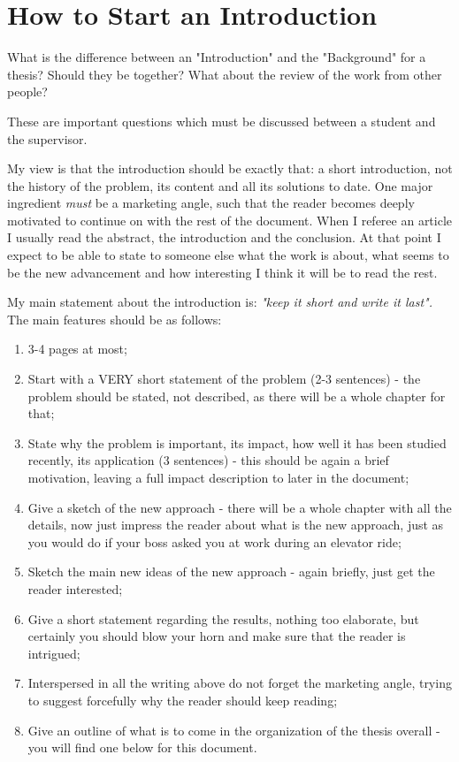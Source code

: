 \section{How to Start an Introduction}



What is the difference between an "Introduction" and the "Background" for a thesis? Should they be together? What about the review of the work from other people?

These are important questions which must be discussed between a student and the supervisor.

My view is that the introduction should be exactly that: a short introduction, not the history of the problem, its content and all its solutions to date. One major ingredient \textit{must} be a marketing angle, such that the reader becomes deeply motivated to continue on with the rest of the document. When I referee an article I usually read the abstract, the introduction and the conclusion. At that point I expect to be able to state to someone else what the work is about, what seems to be the new advancement and how interesting I think it will be to read the rest.

My main statement about the introduction is:
\textit{"keep it short and write it last".} The main features should be as follows:
\begin{enumerate}
\item {3-4 pages at most;}
\item {Start with a VERY short statement of the problem (2-3 sentences) - the problem should be stated, not described, as there will be a whole chapter for that;}
\item {State why the problem is important, its impact, how well it has been studied recently, its application (3 sentences) - this should be again a brief motivation, leaving a full impact description to later in the document;}
\item {Give a sketch of the new approach - there will be a whole chapter with all the details, now just impress the reader about what is the new approach, just as you would do if your boss asked you at work during an elevator ride;}
\item {Sketch the main new ideas of the new approach - again briefly, just get the reader interested;}
\item {Give a short statement regarding the results, nothing too elaborate, but certainly you should blow your horn and make sure that the reader is intrigued;}
\item {Interspersed in all the writing above do not forget the marketing angle, trying to suggest forcefully why the reader should keep reading;}
\item {Give an outline of what is to come in the organization of the thesis overall - you will find one below for this document.}

\end{enumerate}

